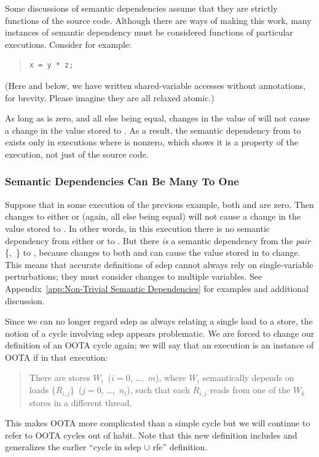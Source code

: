 \documentclass[10]{article}
\begin{document}
Some discussions of semantic dependencies assume that they
are strictly functions of the source code.
Although there are ways of making this work, many instances of
semantic dependency must be considered functions of particular executions.
Consider for example:
\begin{quote}
\begin{verbatim}
x = y * z;
\end{verbatim}
\end{quote}
(Here and below, we have written shared-variable accesses without
annotations, for brevity.  Please imagine they are all relaxed atomic.)

As long as  is zero, and all else being equal, changes in the
value of  will not cause a change in the value stored to .
As a result, the semantic dependency from  to  exists only
in executions where  is nonzero,
which shows it is a property of the execution, not just of the source code.

\subsubsection{Semantic Dependencies Can Be Many To One}
\label{sec:Semantic Dependencies Can Be Many To One}

Suppose that in some execution of the previous example,
both  and  are zero.
Then changes to either  or  (again, all
else being equal) will not cause a change in the value stored to .
In other words, in this execution there is no semantic dependency
from either  or  to .
But there \emph{is} a semantic dependency from the \emph{pair}
\{,~\} to ,
because changes to both  and 
can cause the value stored in  to change.
This means that accurate definitions of sdep cannot always rely on
single-variable perturbations;
they must consider changes to multiple variables.
See Appendix~\ref{app:Non-Trivial Semantic Dependencies}
for examples and additional discussion.

Since we can no longer regard sdep as always relating a single load to a store,
the notion of a cycle involving sdep appears problematic.
We are forced to change our definition of an OOTA cycle again;
we will say that an execution is an instance of OOTA if in that execution:
\begin{quote}
	There are stores
	$W_i$~($i = 0$, \ldots,~$m$),
	where $W_i$ semantically depends on loads
	$\{R_{i,j}\}$~($j = 0$, \ldots,~$n_i$),
	such that each $R_{i,j}$ reads from one of the $W_k$
	stores in a different thread.
\end{quote}
This makes OOTA more complicated than a simple cycle but
we will continue to refer to OOTA cycles out of habit.
Note that this new definition includes and generalizes the earlier
``cycle in sdep $\cup$ rfe'' definition.
\end{document}
